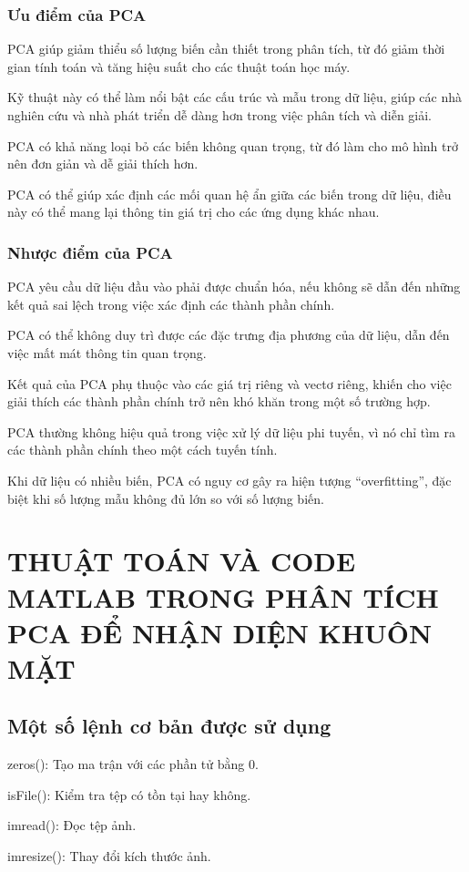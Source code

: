 \documentclass[12pt,a4paper]{article}
\begin{document}
\subsubsection{Ưu điểm của PCA}
PCA giúp giảm thiểu số lượng biến cần thiết trong phân tích, từ đó giảm thời gian tính toán và tăng hiệu suất cho các thuật toán học máy.

Kỹ thuật này có thể làm nổi bật các cấu trúc và mẫu trong dữ liệu, giúp các nhà nghiên cứu và nhà phát triển dễ dàng hơn trong việc phân tích và diễn giải.

PCA có khả năng loại bỏ các biến không quan trọng, từ đó làm cho mô hình trở nên đơn giản và dễ giải thích hơn.

PCA có thể giúp xác định các mối quan hệ ẩn giữa các biến trong dữ liệu, điều này có thể mang lại thông tin giá trị cho các ứng dụng khác nhau.
\subsubsection{Nhược điểm của PCA}
PCA yêu cầu dữ liệu đầu vào phải được chuẩn hóa, nếu không sẽ dẫn đến những kết quả sai lệch trong việc xác định các thành phần chính.

PCA có thể không duy trì được các đặc trưng địa phương của dữ liệu, dẫn đến việc mất mát thông tin quan trọng.

Kết quả của PCA phụ thuộc vào các giá trị riêng và vectơ riêng, khiến cho việc giải thích các thành phần chính trở nên khó khăn trong một số trường hợp.

PCA thường không hiệu quả trong việc xử lý dữ liệu phi tuyến, vì nó chỉ tìm ra các thành phần chính theo một cách tuyến tính. 

Khi dữ liệu có nhiều biến, PCA có nguy cơ gây ra hiện tượng ``overfitting'', đặc biệt khi số lượng mẫu không đủ lớn so với số lượng biến.
\section{THUẬT TOÁN VÀ CODE MATLAB TRONG PHÂN TÍCH PCA ĐỂ NHẬN DIỆN KHUÔN MẶT}
\subsection{Một số lệnh cơ bản được sử dụng}
zeros(): Tạo ma trận với các phần tử bằng 0.

isFile(): Kiểm tra tệp có tồn tại hay không.

imread(): Đọc tệp ảnh.

imresize(): Thay đổi kích thước ảnh.
\end{document}
